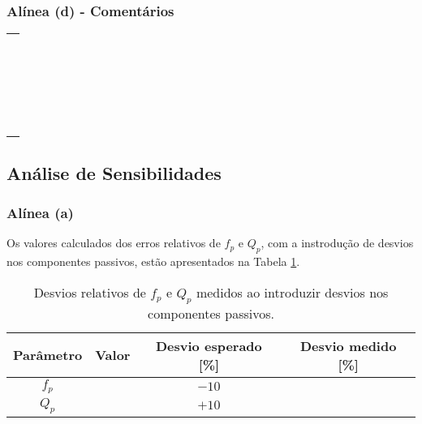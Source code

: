 \subsubsection*{Alínea (d) - Comentários}

\begin{table}[!hb]
\begin{tabularx}{\textwidth}{X}
\hline \\ \hline \\ \hline \\ \hline \\ \hline \\ \hline \\ \hline \\ \hline \\ \hline \\ \hline \\
\hline \\ \hline \\ \hline \\ \hline \\ \hline \\ \hline \\ \hline \\ \hline \\ \hline \\ \hline \\ \hline \\ \hline \\
\end{tabularx}
\end{table}

\subsection{Análise de Sensibilidades}

\subsubsection*{Alínea (a)}

Os valores calculados dos erros relativos de $f_p$ e $Q_p$, com a instrodução de desvios nos componentes passivos, estão apresentados na Tabela \ref{tab:param_exp_desvios_pass}.

\begin{table}[!ht]
\centering
\begin{tabular}{|c|c|c|c|}
\hline
{Parâmetro} &{ Valor} & Desvio esperado [\%] & Desvio medido [\%] \\
\hline\hline
$f_p$ & \quad\quad\quad\quad\quad\quad\quad & $-10$ & \quad\quad\quad\quad\quad\quad\quad  \\
\hline
$Q_p$ && $+10$ & \\
\hline
\end{tabular}
\caption{Desvios relativos de $f_p$ e $Q_p$ medidos ao introduzir desvios nos componentes passivos.}
\label{tab:param_exp_desvios_pass}
\end{table}

